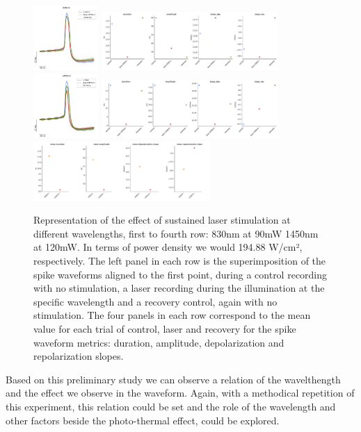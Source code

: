 \begin{figure}[hbt!]
	\centering
	\includegraphics[width=0.22\textwidth]{img/laser/wavelength/830nm.png}
	\includegraphics[width=0.6\textwidth]{img/laser/wavelength/830nmmetrics.pdf}
	\centering
	\includegraphics[width=0.22\textwidth]{img/laser/wavelength/1450nm.png}
	\includegraphics[width=0.6\textwidth]{img/laser/wavelength/1450nmmetrics.pdf}
	\centering
	\includegraphics[width=0.6\textwidth]{img/laser/wavelength/allmetrics.pdf}
	\caption{Representation of the effect of sustained laser stimulation at different wavelengths, first to fourth row: 830nm at 90mW 1450nm at 120mW. In terms of power density we would  194.88 W/cm², respectively. The left panel in each row is the superimposition of the spike waveforms aligned to the first point, during a control recording with no stimulation, a laser recording during the illumination at the specific wavelength and a recovery control, again with no stimulation. The four panels in each row correspond to the mean value for each trial of control, laser and recovery for the spike waveform metrics: duration, amplitude, depolarization and repolarization slopes.}
    \label{fig:wavelengths results}
\end{figure}
Based on this preliminary study we can observe a relation of the wavelthength and the effect we observe in the waveform. Again, with a methodical repetition of this experiment, this relation could be set and the role of the wavelength and other factors beside the photo-thermal effect, could be explored.